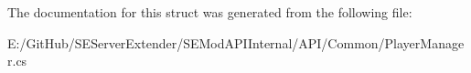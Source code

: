 The documentation for this struct was generated from the following file\+:\begin{DoxyCompactItemize}
\item 
E\+:/\+Git\+Hub/\+S\+E\+Server\+Extender/\+S\+E\+Mod\+A\+P\+I\+Internal/\+A\+P\+I/\+Common/Player\+Manager.\+cs\end{DoxyCompactItemize}
